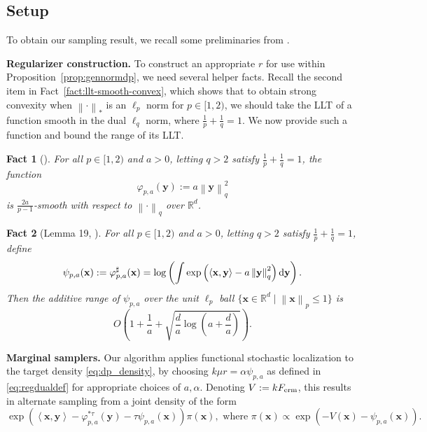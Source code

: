 \documentclass[11pt]{article}
\newtheorem{fact}{Fact}
\newcommand{\defeq}{:=}
\newcommand{\norm}[1]{\left\lVert#1\right\rVert}
\newcommand{\inprod}[2]{\left\langle#1, #2\right\rangle}
\newcommand{\R}{\mathbb{R}}
\newcommand{\dd}{\textup{d}}
\newcommand{\Par}[1]{\left(#1\right)}
\newcommand{\0}{\mathbf{0}}
\newcommand{\1}{\mathbf{1}}
\newcommand{\vx}{\mathbf{x}}
\newcommand{\vy}{\mathbf{y}}
\newcommand{\vhi}{\varphi}
\newcommand{\Ferm}{F_{\textup{erm}}}
\begin{document}
\subsection{Setup}\label{ssec:dp_setup}

To obtain our sampling result, we recall some preliminaries from \cite{GopiLLST25}. 

\textbf{Regularizer construction.} 
To construct an appropriate $r$ for use within Proposition~\ref{prop:gennormdp}, we need several helper facts. Recall the second item in Fact~\ref{fact:llt-smooth-convex}, which shows that to obtain strong convexity when $\norm{\cdot}_*$ is an $\ell_p$ norm for $p \in [1, 2)$, we should take the LLT of a function smooth in the dual $\ell_q$ norm, where $\frac 1 p + \frac 1 q = 1$. We now provide such a function and bound the range of its LLT.

\begin{fact}[\cite{BallCL94, KakadeST09}]\label{fact:dual_smooth}
For all $p \in [1, 2)$ and $a > 0$, letting $q > 2$ satisfy $\frac 1 p + \frac 1 q = 1$, the function 
\begin{equation}\label{eq:regdualdef}
\vhi_{p, a}(\vy) \defeq a\norm{\vy}_q^2
\end{equation}
is $\frac {2a} {p - 1}$-smooth with respect to $\norm{\cdot}_q$ over $\R^d$.
\end{fact}

\begin{fact}[Lemma 19, \cite{GopiLLST25}]\label{fact:llt_range}
For all $p \in [1, 2)$ and $a > 0$, letting $q > 2$ satisfy $\frac 1 p + \frac 1 q = 1$, define
\begin{equation}\label{eq:regdef}
\begin{aligned}
\psi_{p, a}(\vx) \defeq \vhi_{p, a}^\sharp(\vx) = \log\Par{\int \exp\Par{\inprod{\vx}{\vy} - a\norm{\vy}_q^2} \dd \vy}.
\end{aligned}
\end{equation}
Then the additive range of $\psi_{p, a}$ over the unit $\ell_p$ ball $\{\vx \in \R^d \mid \norm{\vx}_p \le 1\}$ is
\[O\Par{1 + \frac 1 a + \sqrt{\frac d a \log\Par{a + \frac d a }}}.\]
\end{fact}

\textbf{Marginal samplers.} Our algorithm applies functional stochastic localization to the target density \eqref{eq:dp_density}, by choosing $k\mu r = \alpha \psi_{p, a}$ as defined in \eqref{eq:regdualdef} for appropriate choices of $a, \alpha$. Denoting $V \defeq k\Ferm$, this results in alternate sampling from a joint density of the form
\begin{equation}\label{eq:dp_joint}\exp\Par{\inprod{\vx}{\vy} - \vhi_{p, a}^{\ast \tau}(\vy) - \tau \psi_{p, a}(\vx)} \pi(\vx), \text{ where } \pi(\vx) \propto \exp\Par{-V(\vx) - \psi_{p, a}(\vx)}.\end{equation}
\end{document}
